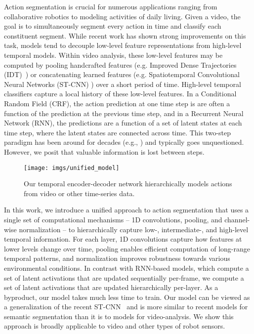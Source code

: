 \documentclass[10pt,twocolumn,letterpaper]{article}
\begin{document}
Action segmentation is crucial for numerous applications ranging from collaborative robotics to modeling activities of daily living. 
Given a video, the goal is to simultaneously segment every action in time and classify each constituent segment.
While recent work has shown strong improvements on this task, 
models tend to decouple low-level feature representations from high-level temporal models. 
Within video analysis, these low-level features may be computed by pooling handcrafted features (e.g. Improved Dense Trajectories (IDT)~\cite{wang_iccv_2013}) 
or concatenating learned features (e.g. Spatiotemporal Convolutional Neural Networks (ST-CNN)  \cite{lea_eccv_2016,ng_cvpr_2015}) over a short period of time. 
High-level temporal classifiers capture a local history of these low-level features. In a Conditional Random Field (CRF), the action prediction at one time step is are often a function of the prediction at the previous time step, and in a Recurrent Neural Network (RNN), the predictions are a function of a set of latent states at each time step, where the latent states are connected across time. 
This two-step paradigm has been around for decades (e.g., \cite{hofmann_accel_1997}) and typically goes unquestioned. However, we posit that valuable information is lost between steps. 



\begin{figure}
	\center
	\texttt{[image: imgs/unified\_model]}
	\caption{Our temporal encoder-decoder network hierarchically models actions from video or other time-series data.}
	\label{fig:unified_model}
\end{figure}

In this work, we introduce a unified approach to action segmentation that uses a single set of computational mechanisms -- 1D convolutions, pooling, and channel-wise normalization -- to hierarchically capture low-, intermediate-, and high-level temporal information. 
For each layer, 1D convolutions capture how features at lower levels change over time, pooling enables efficient computation of long-range temporal patterns, and normalization improves robustness towards various environmental conditions.
In contrast with RNN-based models, which compute a set of latent activations that are updated sequentially per-frame, we compute a set of latent activations that are updated hierarchically per-layer. 
As a byproduct, our model takes much less time to train.
Our model can be viewed as a generalization of the recent ST-CNN~\cite{lea_eccv_2016}
and is more similar to recent models for semantic segmentation than it is to models for video-analysis.
We show this approach is broadly applicable to video and other types of robot sensors.
\end{document}
